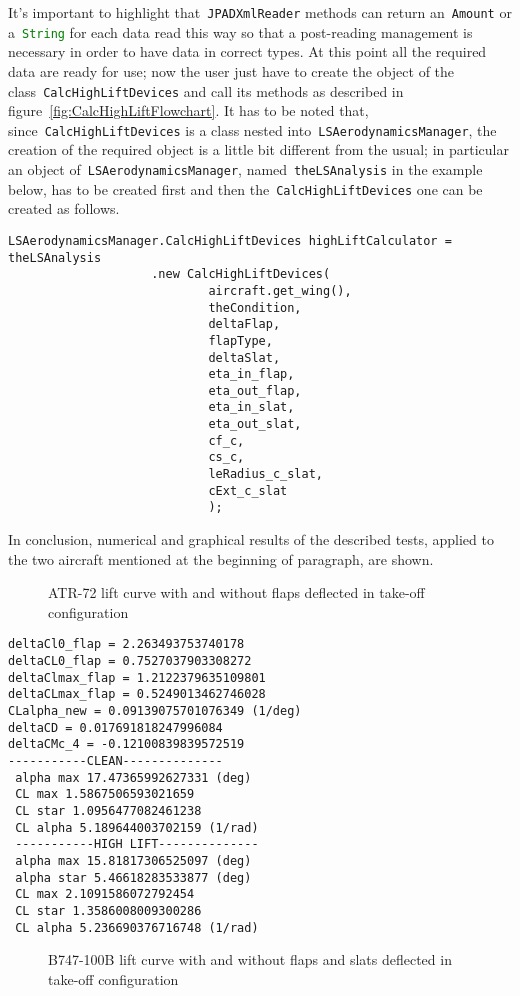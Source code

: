 \bigskip
\noindent
It's important to highlight that~\lstinline[language=Java]!JPADXmlReader! methods can return an~\lstinline[language=Java]!Amount!\cite{jscienceAmount} or a~\lstinline[language=Java]!String! for each data read this way so that a post-reading management is necessary in order to have data in correct types. At this point all the required data are ready for use; now the user just have to create the object of the class~\lstinline[language=Java]!CalcHighLiftDevices! and call its methods as described in figure~\ref{fig:CalcHighLiftFlowchart}.
%
It has to be noted that, since~\lstinline[language=Java]!CalcHighLiftDevices! is a class nested into~\lstinline[language=Java]!LSAerodynamicsManager!, the creation of the required object is a little bit different from the usual; in particular an object of~\lstinline[language=Java]!LSAerodynamicsManager!, named~\lstinline[language=Java]!theLSAnalysis! in the example below, has to be created first and then the~\lstinline[language=Java]!CalcHighLiftDevices! one can be created as follows.

\bigskip
\lstset{language=Java}
\begin{lstlisting}[caption={Excerpt of B747-100B test - calculator object creation}, captionpos=b, tabsize=2]
	LSAerodynamicsManager.CalcHighLiftDevices highLiftCalculator = theLSAnalysis
					.new CalcHighLiftDevices(
							aircraft.get_wing(),
							theCondition,
							deltaFlap,
							flapType,
							deltaSlat,
							eta_in_flap,
							eta_out_flap,
							eta_in_slat,
							eta_out_slat,
							cf_c,
							cs_c,
							leRadius_c_slat,
							cExt_c_slat
							);
\end{lstlisting}

\bigskip
\noindent
In conclusion, numerical and graphical results of the described tests, applied to the two aircraft mentioned at the beginning of paragraph, are shown.
%
\begin{figure}[H]
\centering

\caption{ATR-72 lift curve with and without flaps deflected in take-off configuration}
\label{fig:FlapATR}
\end{figure}

\bigskip
\lstset{language=Java}
\begin{lstlisting}[caption={ATR-72 test results}, captionpos=b, tabsize=2]
deltaCl0_flap = 2.263493753740178
deltaCL0_flap = 0.7527037903308272
deltaClmax_flap = 1.2122379635109801
deltaCLmax_flap = 0.5249013462746028
CLalpha_new = 0.09139075701076349 (1/deg)
deltaCD = 0.017691818247996084
deltaCMc_4 = -0.12100839839572519
-----------CLEAN-------------- 
 alpha max 17.47365992627331 (deg)
 CL max 1.5867506593021659
 CL star 1.0956477082461238
 CL alpha 5.189644003702159 (1/rad)
 -----------HIGH LIFT-------------- 
 alpha max 15.81817306525097 (deg)
 alpha star 5.46618283533877 (deg)
 CL max 2.1091586072792454
 CL star 1.3586008009300286
 CL alpha 5.236690376716748 (1/rad)
\end{lstlisting}
%
\begin{figure}[H]
\centering

\caption{B747-100B lift curve with and without flaps and slats deflected in take-off configuration}
\label{fig:FlapATR}
\end{figure}

